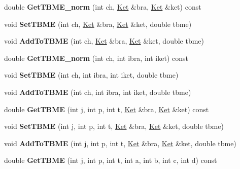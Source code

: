 \begin{DoxyCompactItemize}
double {\bfseries Get\+T\+B\+M\+E\+\_\+norm} (int ch, \hyperlink{classKet}{Ket} \&bra, \hyperlink{classKet}{Ket} \&ket) const
\item 
\mbox{\label{classTwoBodyME_a8b42151c12ae112e507e1ab9b1053427}} 
void {\bfseries Set\+T\+B\+ME} (int ch, \hyperlink{classKet}{Ket} \&bra, \hyperlink{classKet}{Ket} \&ket, double tbme)
\item 
\mbox{\label{classTwoBodyME_a0e92d946139161a62151508fd82b545f}} 
void {\bfseries Add\+To\+T\+B\+ME} (int ch, \hyperlink{classKet}{Ket} \&bra, \hyperlink{classKet}{Ket} \&ket, double tbme)
\item 
\mbox{\label{classTwoBodyME_a5a27797e50e4203c678a812b061d0d9e}} 
double {\bfseries Get\+T\+B\+M\+E\+\_\+norm} (int ch, int ibra, int iket) const
\item 
\mbox{\label{classTwoBodyME_a194371fee0b854e0c7342943a41aa28e}} 
void {\bfseries Set\+T\+B\+ME} (int ch, int ibra, int iket, double tbme)
\item 
\mbox{\label{classTwoBodyME_a97d624575ad1eb7704d5b46fead19b20}} 
void {\bfseries Add\+To\+T\+B\+ME} (int ch, int ibra, int iket, double tbme)
\item 
\mbox{\label{classTwoBodyME_afbdedfaf6ae67aa7b151fded81113bd2}} 
double {\bfseries Get\+T\+B\+ME} (int j, int p, int t, \hyperlink{classKet}{Ket} \&bra, \hyperlink{classKet}{Ket} \&ket) const
\item 
\mbox{\label{classTwoBodyME_a68578ba3df3f1b511d295d48071886ee}} 
void {\bfseries Set\+T\+B\+ME} (int j, int p, int t, \hyperlink{classKet}{Ket} \&bra, \hyperlink{classKet}{Ket} \&ket, double tbme)
\item 
\mbox{\label{classTwoBodyME_afab3a9c6c8bdca85fba816a94b326217}} 
void {\bfseries Add\+To\+T\+B\+ME} (int j, int p, int t, \hyperlink{classKet}{Ket} \&bra, \hyperlink{classKet}{Ket} \&ket, double tbme)
\item 
\mbox{\label{classTwoBodyME_a39ae626faf77c3548479226897482706}} 
double {\bfseries Get\+T\+B\+ME} (int j, int p, int t, int a, int b, int c, int d) const

\end{DoxyCompactItemize}
